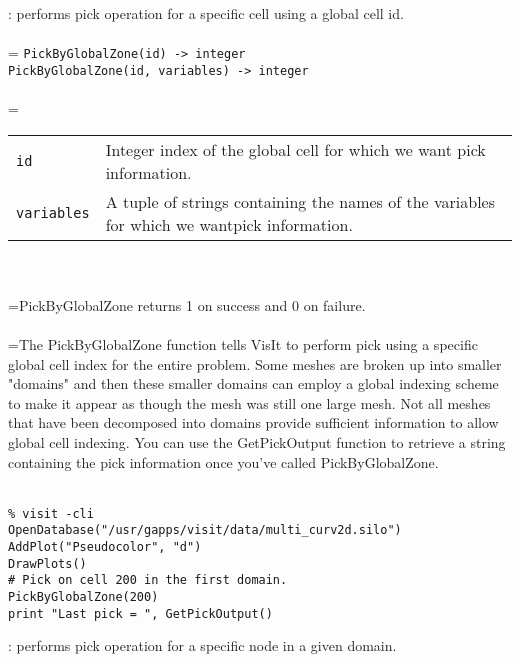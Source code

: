 \documentclass[10pt,a4paper]{report}
\begin{document}
{}
: performs pick operation for a specific cell using a global cell id.\\[-3mm]

 \\ 
\hangindent=\parindent 
\verb!PickByGlobalZone(id) -> integer!\\ 
\verb!PickByGlobalZone(id, variables) -> integer!\\ [-3mm]

 \\ 
\hangindent=\parindent 
\begin{tabular}{lp{9cm}}
\verb!id! & Integer index of the global cell for which we want pick information. \\
\verb!variables! & A tuple of strings containing the names of the variables for which we wantpick information. \\
\end{tabular} \\[-2mm]


 \\ 
\hangindent=\parindent PickByGlobalZone returns 1 on success and 0 on failure. \\[-3mm] 

 \\ 
\hangindent=\parindent The PickByGlobalZone function tells VisIt to perform pick using a specific global cell index for the entire problem. Some meshes are broken up into smaller "domains" and then these smaller domains can employ a global indexing scheme to make it appear as though the mesh was still one large mesh. Not all meshes that have been decomposed into domains provide sufficient information to allow global cell indexing. You can use the GetPickOutput function to retrieve a string containing the pick information once you've called PickByGlobalZone. \\[-3mm] 

\\[-6mm]
\begin{verbatim}% visit -cli
OpenDatabase("/usr/gapps/visit/data/multi_curv2d.silo")
AddPlot("Pseudocolor", "d")
DrawPlots()
# Pick on cell 200 in the first domain.
PickByGlobalZone(200)
print "Last pick = ", GetPickOutput()
\end{verbatim}
\newpage


{}
: performs pick operation for a specific node in a given domain.\\[-3mm]
\end{document}
